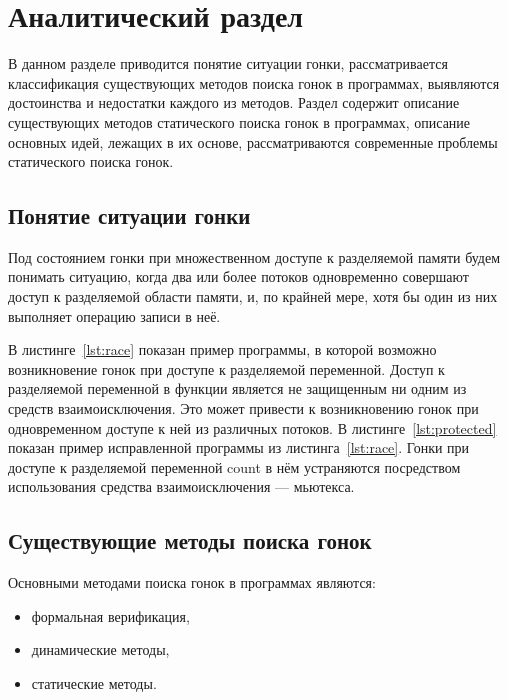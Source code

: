 \chapter{Аналитический раздел}
\label{cha:analysis}

В данном разделе приводится понятие ситуации гонки, рассматривается классификация существующих методов поиска гонок в программах, выявляются достоинства и недостатки каждого из методов. Раздел содержит описание существующих методов статического поиска гонок в программах, описание основных идей, лежащих в их основе, рассматриваются современные проблемы статического поиска гонок.

\section{Понятие ситуации гонки}

Под состоянием гонки при множественном доступе к разделяемой памяти будем понимать ситуацию, когда два или более потоков одновременно совершают доступ к разделяемой области памяти, и, по крайней мере, хотя бы один из них выполняет операцию записи в неё.

В листинге~\ref{lst:race} показан пример программы, в которой возможно возникновение гонок при доступе к разделяемой переменной. Доступ к разделяемой переменной в функции является не защищенным ни одним из средств взаимоисключения. Это может привести к возникновению гонок при одновременном доступе к ней из различных потоков. В листинге~\ref{lst:protected} показан пример исправленной программы из листинга~\ref{lst:race}. Гонки при доступе к разделяемой переменной count в нём устраняются посредством использования средства взаимоисключения — мьютекса.





\section{Существующие методы поиска гонок}

Основными методами поиска гонок в программах являются:

\begin{itemize}
  \item формальная верификация,
  \item динамические методы,
  \item статические методы.
\end{itemize}

